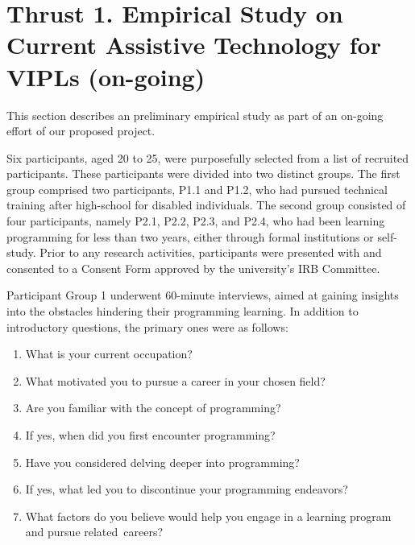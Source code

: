 \section{Thrust 1. Empirical Study on Current Assistive Technology for VIPLs (on-going)}
\label{sec:thrust1}

This section describes an preliminary empirical study as part of an
on-going effort of our proposed project.


Six participants,
aged 20 to 25, were purposefully selected from a list of recruited
participants. These participants were divided into two distinct
groups. The first group comprised two participants, P1.1 and P1.2, who
had pursued technical training after high-school for disabled
individuals. The second group consisted of four participants, namely
P2.1, P2.2, P2.3, and P2.4, who had been learning programming for less
than two years, either through formal institutions or
self-study. Prior to any research activities, participants were
presented with and consented to a Consent Form approved by the
university's IRB Committee.

Participant Group 1 underwent 60-minute interviews, aimed at gaining
insights into the obstacles hindering their programming learning. In
addition to introductory questions, the primary ones were as
follows:

\begin{enumerate}

\item What is your current occupation?
  
\item What motivated you to pursue a career in your chosen field?

\item Are you familiar with the concept of programming?

\item If yes, when did you first encounter programming?
  
\item Have you considered delving deeper into programming?

\item If yes, what led you to discontinue your programming endeavors?

\item What factors do you believe would help you engage in a learning program and pursue related~careers?

\end{enumerate}
  
